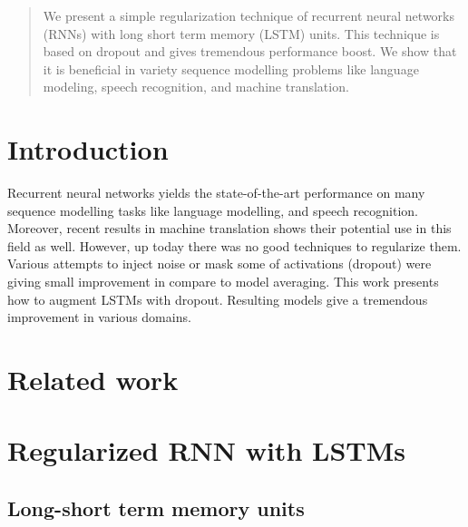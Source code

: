 \documentclass{article}
\begin{document}
 


\begin{abstract} 
  We present a simple regularization technique of recurrent neural networks (RNNs)
  with long short term memory (LSTM) units.
  This technique is based on dropout and gives tremendous performance boost.
  We show that it is beneficial in variety sequence modelling problems like
  language modeling, speech recognition, and machine translation.

\end{abstract} 

\section{Introduction}
Recurrent neural networks yields the state-of-the-art performance on many sequence modelling
tasks like language modelling, and speech recognition. Moreover, recent results in 
machine translation \cite{cho2014learning} shows their potential use in this field as well. 
However, up today there was no good techniques to regularize them. 
Various attempts to inject noise or mask some of activations (dropout) were 
giving small improvement in compare to model averaging. This work presents
how to augment LSTMs with dropout. Resulting models give a tremendous 
improvement in various domains.


\section{Related work}

\cite{hochreiter1997long}

\section{Regularized RNN with LSTMs}

\subsection{Long-short term memory units}
\end{document}
